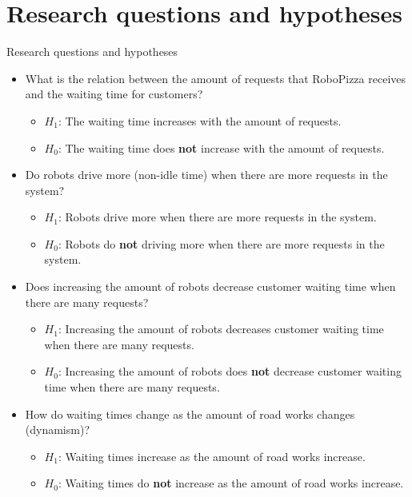 \section{Research questions and hypotheses}

\begin{frame}[allowframebreaks]{Research questions and hypotheses}
    \begin{itemize}
        \item What is the relation between the amount of requests that RoboPizza receives and the waiting time for customers?
        \begin{itemize}
                \item $H_1$: The waiting time increases with the amount of requests.
                \item $H_0$: The waiting time does \textbf{not} increase with the amount of requests.
        \end{itemize}

        \item Do robots drive more (non-idle time) when there are more requests in the system?
        \begin{itemize}
                \item $H_1$: Robots drive more when there are more requests in the system.
                \item $H_0$: Robots do \textbf{not} driving more when there are more requests in the system.
        \end{itemize}

        \framebreak

        \item Does increasing the amount of robots decrease customer waiting time when there are many requests?
        \begin{itemize}
                \item $H_1$: Increasing the amount of robots decreases customer waiting time when there are many requests.
                \item $H_0$: Increasing the amount of robots does \textbf{not} decrease customer waiting time when there are many requests.
        \end{itemize}

        \item How do waiting times change as the amount of road works changes (dynamism)?
        \begin{itemize}
            \item $H_1$: Waiting times increase as the amount of road works increase.
            \item $H_0$: Waiting times do \textbf{not} increase as the amount of road works increase.
        \end{itemize}
    \end{itemize}
\end{frame}
